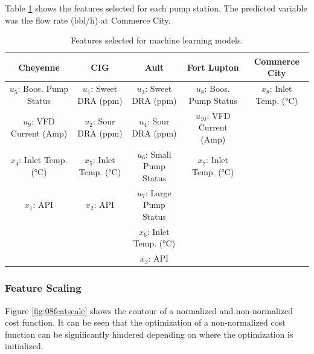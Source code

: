 Table \ref{tab:08featselect} shows the features selected for each pump station. The predicted variable was the flow rate (bbl/h) at Commerce City.
\begin{table}[h]
    \centering
    {\tiny
    {
    \begin{tabular}{ c | c | c | c | c}
        Cheyenne                       & CIG                      & Ault                        & Fort Lupton                    & Commerce City \\
        \hline
        $u_5$: Boos. Pump Status       &  $u_1$: Sweet DRA (ppm)  &  $u_3$: Sweet DRA (ppm)     &  $u_{8}$: Boos. Pump Status   &  $x_{8}$: Inlet Temp. (°C) \\
        
        $u_9$: VFD Current (Amp)       &  $u_2$: Sour DRA (ppm)   &  $u_4$: Sour DRA (ppm)      & $u_{10}$: VFD Current (Amp)      & \\
        
        $x_{4}$: Inlet Temp. (°C)     &  $x_{5}$: Inlet Temp. (°C) &  $u_6$: Small Pump Status &  $x_{7}$: Inlet Temp. (°C)  & \\
        
        $x_{1}$: API                   &  $x_{2}$: API          &  $u_7$: Large Pump Status   &             
        & \\
        
                                       &                          &  $x_{6}$: Inlet Temp. (°C)  &             
        & \\
        
                                       &                          &  $x_{3}$: API               &       
        & \\
        
    \end{tabular}}}
    \caption{Features selected for machine learning models.}
    \label{tab:08featselect}
\end{table}

\subsubsection{Feature Scaling}
Figure \ref{fig:08featscale} shows the contour of a normalized and non-normalized cost function. It can be seen that the optimization of a non-normalized cost function can be significantly hindered depending on where the optimization is initialized.

